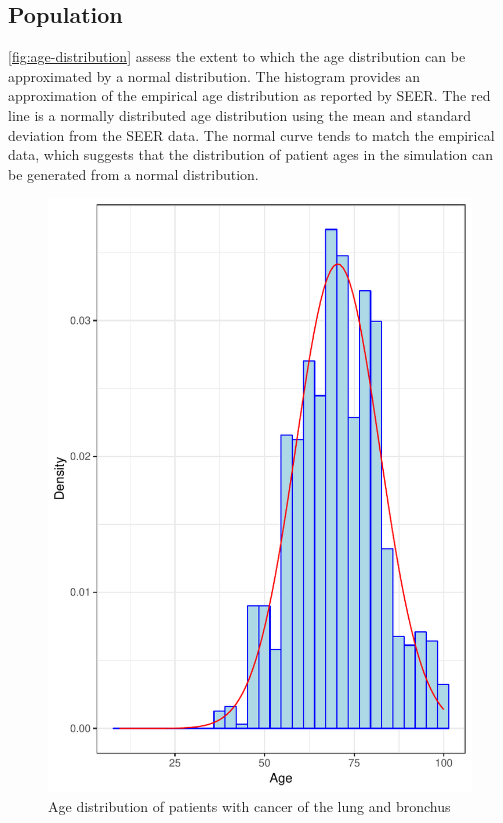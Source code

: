 \documentclass[11pt,final,fleqn]{article}\usepackage[]{graphicx}\usepackage[]{color}
\theoremstyle{plain}
\begin{document}
\begin{appendices}
\setcounter{table}{0}
\renewcommand{\thetable}{A\arabic{table}}
\setcounter{figure}{0}
\renewcommand{\thefigure}{A\arabic{figure}}
\setcounter{equation}{0}
\renewcommand{\theequation}{A\arabic{equation}}

\section{Population}\label{app:pop}
\autoref{fig:age-distribution} assess the extent to which the age distribution can be approximated by a normal distribution. The histogram provides an approximation of the empirical age distribution as reported by SEER. The red line is a normally distributed age distribution using the mean and standard deviation from the SEER data. The normal curve tends to match the empirical data, which suggests that the distribution of patient ages in the simulation can be generated from a normal distribution.

\begin{figure}
\centering
\includegraphics[scale = .8]{../../data-raw/figs/age-density.pdf}
\caption{Age distribution of patients with cancer of the lung and bronchus}\label{fig:age-distribution}
\end{figure}



\end{appendices}
\end{document}
